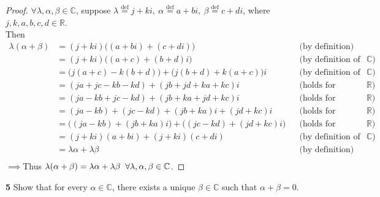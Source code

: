 \documentclass{article}
\begin{document}
\begin{proof}
    $\forall \lambda, \alpha, \beta \in \mathbb{C}$, suppose $\lambda \stackrel{\text{def}}{=} j + ki, \ \alpha \stackrel{\text{def}}{=} a + bi, \ \beta \stackrel{\text{def}}{=} c + di$, where $j, k, a, b, c, d \in \mathbb{R}$.\\
    \indent Then
    \begin{align*}
        \lambda(\alpha + \beta) &= (j + ki)\Big((a + bi) + (c + di)\Big) &&\text{(by definition)}\\
        &= (j + ki)\Big((a+c) + (b + d)i\Big) &&\text{(by definition of addition over $\mathbb{C}$)}\\
        &= \Big(j(a + c) - k(b + d)\Big) + \Big(j(b + d) + k(a + c)\Big)i &&\text{(by definition of multiplication over $\mathbb{C}$)}\\
        &= (ja + jc - kb - kd) + (jb + jd + ka + kc)i &&\text{(holds for distributivity over $\mathbb{R}$)}\\
        &= (ja - kb + jc - kd) + (jb + ka + jd + kc)i &&\text{(holds for commutativity over $\mathbb{R}$)}\\
        &= (ja - kb) + (jc - kd) + (jb + ka)i + (jd + kc)i &&\text{(holds for distributivity over $\mathbb{R}$)}\\
        &= \Big((ja - kb) + (jb + ka)i\Big) + \Big((jc - kd) + (jd + kc)i\Big) &&\text{(holds for commutativity over $\mathbb{R}$)}\\
        &= (j + ki)(a + bi) + (j + ki)(c + di) &&\text{(by definition of multiplication over $\mathbb{C}$)}\\
        &= \lambda\alpha + \lambda\beta &&\text{(by definition)}\\
    \end{align*}
    $\implies$Thus $\lambda(\alpha + \beta) = \lambda\alpha + \lambda\beta \hspace{2 mm} \forall \lambda, \alpha, \beta \in \mathbb{C}$.
\end{proof}
\color{black}

\pagebreak

\noindent \textbf{5} \hspace{3 mm} Show that for every $\alpha \in \mathbb{C}$, there exists a unique $\beta \in \mathbb{C}$ such that $\alpha + \beta = 0$. \color{red}
\end{document}
